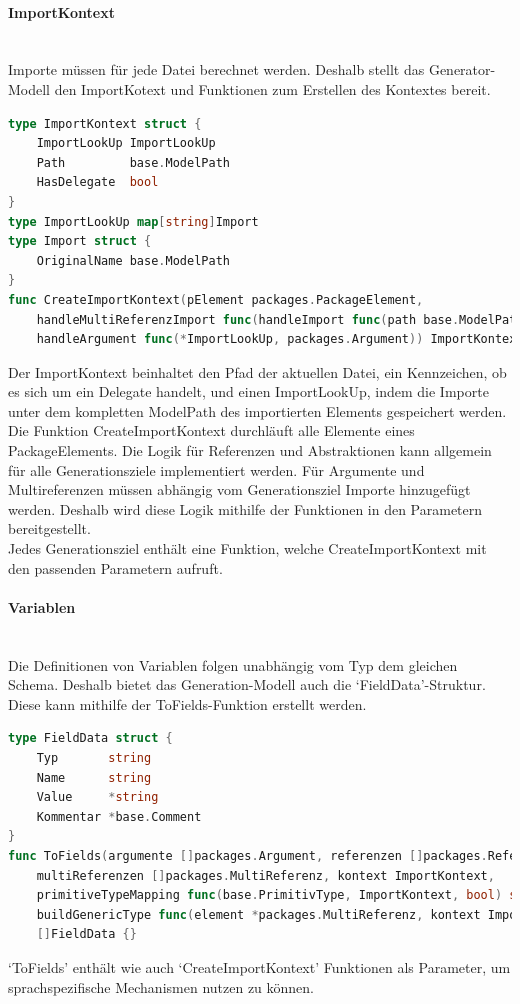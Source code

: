 \documentclass[./einleitung.tex]{subfiles}
\begin{document}
    \paragraph{ImportKontext}\mbox{}\\
    Importe müssen für jede Datei berechnet werden.
    Deshalb stellt das Generator-Modell den ImportKotext und Funktionen zum Erstellen des Kontextes bereit.
    \begin{lstlisting}[language=Go, caption=ImportKontext, label=lst:importKontext]
type ImportKontext struct {
	ImportLookUp ImportLookUp
	Path         base.ModelPath
	HasDelegate  bool
}
type ImportLookUp map[string]Import
type Import struct {
	OriginalName base.ModelPath
}
func CreateImportKontext(pElement packages.PackageElement,
	handleMultiReferenzImport func(handleImport func(path base.ModelPath), typ packages.MultiReferenzType),
	handleArgument func(*ImportLookUp, packages.Argument)) ImportKontext {}
    \end{lstlisting}
    Der ImportKontext beinhaltet den Pfad der aktuellen Datei, ein Kennzeichen, ob es sich um ein Delegate handelt, und einen ImportLookUp, indem die Importe unter dem kompletten ModelPath des importierten Elements gespeichert werden.
    Die Funktion CreateImportKontext durchläuft alle Elemente eines PackageElements.
    Die Logik für Referenzen und Abstraktionen kann allgemein für alle Generationsziele implementiert werden.
    Für Argumente und Multireferenzen müssen abhängig vom Generationsziel Importe hinzugefügt werden.
    Deshalb wird diese Logik mithilfe der Funktionen in den Parametern bereitgestellt.\\
    Jedes Generationsziel enthält eine Funktion, welche CreateImportKontext mit den passenden Parametern aufruft.

    \paragraph{Variablen}\mbox{}\\
    Die Definitionen von Variablen folgen unabhängig vom Typ dem gleichen Schema.
    Deshalb bietet das Generation-Modell auch die `FieldData'-Struktur.
    Diese kann mithilfe der ToFields-Funktion erstellt werden.
    \begin{lstlisting}[language=Go, caption=Definition von FieldData und Konstruktor, label=lst:varkontext]
type FieldData struct {
	Typ       string
	Name      string
	Value     *string
	Kommentar *base.Comment
}
func ToFields(argumente []packages.Argument, referenzen []packages.Referenz,
    multiReferenzen []packages.MultiReferenz, kontext ImportKontext,
	primitiveTypeMapping func(base.PrimitivType, ImportKontext, bool) string,
	buildGenericType func(element *packages.MultiReferenz, kontext ImportKontext) (typ string, value string))
    []FieldData {}
    \end{lstlisting}
    `ToFields' enthält wie auch `CreateImportKontext' Funktionen als Parameter, um sprachspezifische Mechanismen nutzen zu können.
\end{document}
